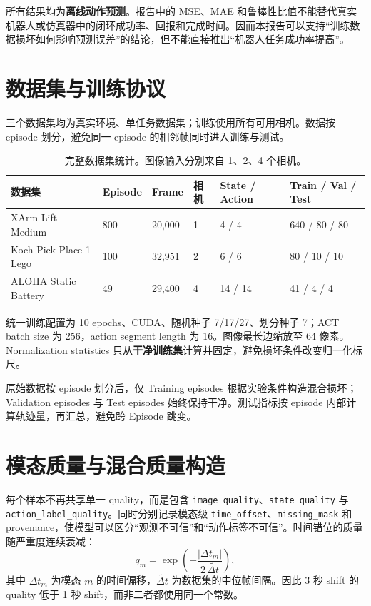 \documentclass[11pt,a4paper]{ctexart}
\newcommand{\code}[1]{\texttt{\small #1}}
\begin{document}
所有结果均为\textbf{离线动作预测}。报告中的 MSE、MAE 和鲁棒性比值不能替代真实机器人或仿真器中的闭环成功率、回报和完成时间。因而本报告可以支持“训练数据损坏如何影响预测误差”的结论，但不能直接推出“机器人任务成功率提高”。

\section{数据集与训练协议}

三个数据集均为真实环境、单任务数据集；训练使用所有可用相机。数据按 episode 划分，避免同一 episode 的相邻帧同时进入训练与测试。

\begin{table}[htbp]
\centering
\small
\begin{tabularx}{\linewidth}{Y C{14mm} C{18mm} C{14mm} C{22mm} C{24mm}}
\toprule
数据集 & Episode & Frame & 相机 & State / Action & Train / Val / Test\\
\midrule
XArm Lift Medium & 800 & 20,000 & 1 & 4 / 4 & 640 / 80 / 80\\
Koch Pick Place 1 Lego & 100 & 32,951 & 2 & 6 / 6 & 80 / 10 / 10\\
ALOHA Static Battery & 49 & 29,400 & 4 & 14 / 14 & 41 / 4 / 4\\
\bottomrule
\end{tabularx}
\caption{完整数据集统计。图像输入分别来自 1、2、4 个相机。}
\end{table}

统一训练配置为 10 epochs、CUDA、随机种子 7/17/27、划分种子 7；ACT batch size 为 256，action segment length 为 16。图像最长边缩放至 64 像素。Normalization statistics 只从\textbf{干净训练集}计算并固定，避免损坏条件改变归一化标尺。

\begin{tcolorbox}[colback=panel,colframe=rule,title={\color{navy}\bfseries 数据隔离规则},fonttitle=\bfseries]
原始数据按 episode 划分后，仅 Training episodes 根据实验条件构造混合损坏；Validation episodes 与 Test episodes 始终保持干净。测试指标按 episode 内部计算轨迹量，再汇总，避免跨 Episode 跳变。
\end{tcolorbox}

\section{模态质量与混合质量构造}

每个样本不再共享单一 quality，而是包含 \code{image\_quality}、\code{state\_quality} 与 \code{action\_label\_quality}。同时分别记录模态级 \code{time\_offset}、\code{missing\_mask} 和 provenance，使模型可以区分“观测不可信”和“动作标签不可信”。时间错位的质量随严重度连续衰减：
\[
q_m=\exp\!\left(-\frac{|\Delta t_m|}{2\,\widetilde{\Delta t}}\right),
\]
其中 $\Delta t_m$ 为模态 $m$ 的时间偏移，$\widetilde{\Delta t}$ 为数据集的中位帧间隔。因此 3 秒 shift 的 quality 低于 1 秒 shift，而非二者都使用同一个常数。
\end{document}
